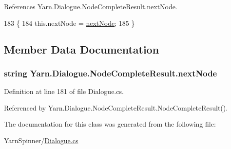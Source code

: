 References Yarn.\-Dialogue.\-Node\-Complete\-Result.\-next\-Node.


\begin{DoxyCode}
183                                                         \{
184                 this.nextNode = \hyperlink{a00130_ad48b37b51066b94cd48c58626ac0e774}{nextNode};
185             \}
\end{DoxyCode}


\subsection{Member Data Documentation}
\hypertarget{a00130_ad48b37b51066b94cd48c58626ac0e774}{
\subsubsection[{next\-Node}]{\setlength{\rightskip}{0pt plus 5cm}string Yarn.\-Dialogue.\-Node\-Complete\-Result.\-next\-Node}}\label{a00130_ad48b37b51066b94cd48c58626ac0e774}


Definition at line 181 of file Dialogue.\-cs.



Referenced by Yarn.\-Dialogue.\-Node\-Complete\-Result.\-Node\-Complete\-Result().



The documentation for this class was generated from the following file\-:\begin{DoxyCompactItemize}
\item 
Yarn\-Spinner/\hyperlink{a00282}{Dialogue.\-cs}\end{DoxyCompactItemize}
